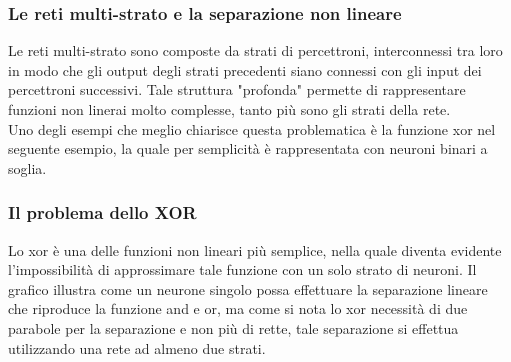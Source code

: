 \documentclass[10pt,a4paper]{article}
\begin{document}
\subsubsection*{Le reti multi-strato e la separazione non lineare} 
Le reti multi-strato sono composte da strati di percettroni, interconnessi tra loro in modo che gli output degli strati precedenti siano connessi con gli input dei percettroni successivi. Tale struttura "profonda" permette di rappresentare funzioni non linerai molto complesse, tanto più sono gli strati della rete.\\
Uno degli esempi che meglio chiarisce questa problematica è la funzione xor nel seguente esempio, la quale per semplicità è rappresentata con neuroni binari a soglia.

\subsubsection*{Il problema dello XOR}
Lo xor è una delle funzioni non lineari più semplice, nella quale diventa evidente l'impossibilità di approssimare tale funzione con un solo strato di neuroni.
Il grafico illustra come un neurone singolo possa effettuare la separazione lineare che riproduce la funzione and e or, ma come si nota lo xor necessità di due parabole per la separazione e non più di rette, tale separazione si effettua utilizzando una rete ad almeno due strati. 
%
\end{document}

